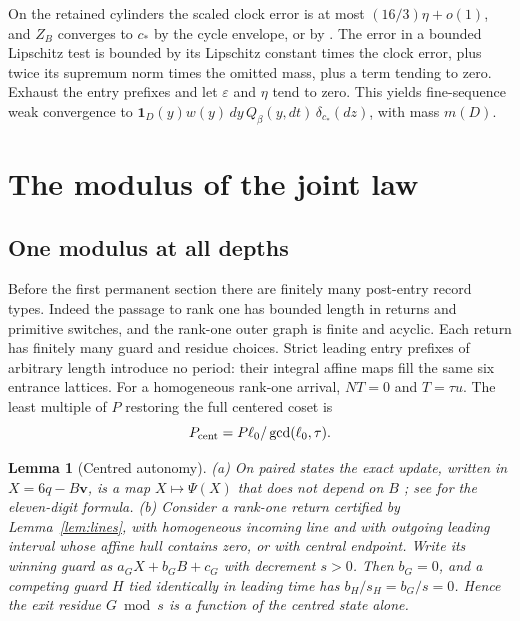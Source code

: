 \documentclass[11pt,reqno]{amsart}
\newtheorem{lemma}[theorem]{Lemma}
\theoremstyle{definition}
\newcommand{\vct}{\mathbf v}
\newcommand{\cen}{c_*}
\newcommand{\one}{\mathbf 1}
\newcommand{\ZB}{Z_B}
\begin{document}
On the retained cylinders the scaled clock error is at most
\((16/3)\eta+o(1)\), and \(\ZB\) converges to \(\cen\) by the cycle
envelope, or by \cite[Theorem~1]{G6}. The error in a bounded Lipschitz
test is bounded by its Lipschitz constant times the clock error,
plus twice its supremum norm times the omitted mass, plus a term
tending to zero. Exhaust the entry prefixes and let \(\varepsilon\)
and \(\eta\) tend to zero. This yields fine-sequence weak convergence
to \(\one_D(y)w(y)\,dy\,Q_\beta(y,dt)\,\delta_{\cen}(dz)\), with mass
\(m(D)\).

\section{The modulus of the joint law}\label{sec:classes}

\subsection{One modulus at all depths}\label{sec:onemod}
Before the first permanent section there are finitely many post-entry
record types. Indeed the passage to rank one has bounded length in
returns and primitive switches, and the rank-one outer graph is finite
and acyclic. Each return has finitely many guard and residue choices.
Strict leading entry prefixes of arbitrary length introduce no period:
their integral affine maps fill the same six entrance lattices.
For a homogeneous rank-one arrival, \(NT=0\) and \(T=\tau u\).
The least multiple of \(P\) restoring the full centered coset is
\[
 P_{\rm cent}=P\ell_0/\gcd(\ell_0,\tau).
\]

\begin{lemma}[Centred autonomy]\label{lem:autonomy}
\textup{(a)} On paired states the exact update, written in
\(X=6q-B\vct\), is a map \(X\mapsto\Psi(X)\) that does not depend on \(B\)
\cite[Theorem~4]{G4}; see \cite[Section~2]{G7} for the eleven-digit formula.
\textup{(b)} Consider a rank-one return certified by Lemma~\ref{lem:lines},
with homogeneous incoming line and with outgoing leading interval whose
affine hull contains zero, or with central endpoint. Write its winning guard
as \(a_GX+b_GB+c_G\) with decrement \(s>0\). Then \(b_G=0\), and a
competing guard \(H\) tied identically in leading time has
\(b_H/s_H=b_G/s=0\). Hence the exit residue \(G\bmod s\) is a function of the
centred state alone.
\end{lemma}
\end{document}
